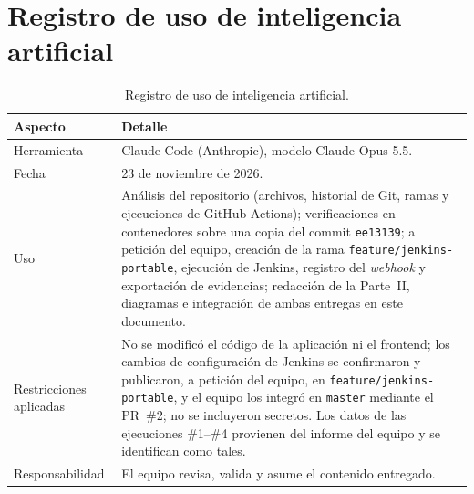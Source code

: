 \documentclass[11pt,a4paper]{article}
\begin{document}
\section{Registro de uso de inteligencia artificial}
\label{anx:ia}

\begin{table}[H]
\centering
\small
\begin{tabularx}{\textwidth}{@{}P{3.2cm} L@{}}
\toprule
\textbf{Aspecto} & \textbf{Detalle}\\
\midrule
Herramienta & Claude Code (Anthropic), modelo Claude Opus 5.5.\\
Fecha & 23 de noviembre de 2026.\\
Uso & Análisis del repositorio (archivos, historial de Git, ramas y ejecuciones de GitHub Actions);
verificaciones en contenedores sobre una copia del commit \texttt{ee13139}; a petición del equipo,
creación de la rama \texttt{feature/jenkins-portable}, ejecución de Jenkins, registro del
\emph{webhook} y exportación de evidencias; redacción de la Parte~II, diagramas e integración de ambas entregas en este documento.\\
Restricciones aplicadas & No se modificó el código de la aplicación ni el frontend; los cambios de
configuración de Jenkins se confirmaron y publicaron, a petición del equipo, en
\texttt{feature/jenkins-portable}, y el equipo los integró en \texttt{master} mediante el PR~\#2;
no se incluyeron secretos. Los datos de las ejecuciones \#1--\#4 provienen del
informe del equipo y se identifican como tales.\\
Responsabilidad & El equipo revisa, valida y asume el contenido entregado.\\
\bottomrule
\end{tabularx}
\caption{Registro de uso de inteligencia artificial.}
\label{tab:ia}
\end{table}
\end{document}
